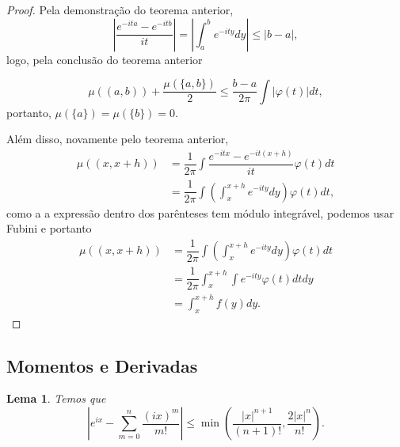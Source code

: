 \documentclass[12pt,a4paper,oneside]{book}
\newtheorem{lemma}[theorem]{Lema}
\theoremstyle{definition}
\theoremstyle{remark}
\numberwithin{equation}{section}
\begin{document}
\begin{proof}
Pela demonstração do teorema anterior,
$$\left| \dfrac{ e^{-ita}-e^{-itb}}{it}\right| = \left| \int^b_a e^{-ity}dy  \right| \leq |b-a|, $$
logo, pela conclusão do teorema anterior

$$\mu((a,b)) + \dfrac{\mu(\{a,b\})}{2} \leq \dfrac{b-a}{2\pi}\int |\varphi(t)|dt, $$
portanto, $\mu(\{a\}) = \mu(\{b\})=0.$

Além disso, novamente pelo teorema anterior,
\begin{align*}
\mu((x,x+h)) & = \dfrac{1}{2\pi}\int \dfrac{e^{-itx} - e^{-it(x+h)}}{it}\varphi(t)dt\\
& = \dfrac{1}{2\pi}\int\left( \int^{x+h}_{x} e^{-ity}dy \right)\varphi(t)dt,
\end{align*}
como a a expressão dentro dos parênteses tem módulo integrável, podemos usar Fubini e portanto
\begin{align*}
\mu((x,x+h)) &  = \dfrac{1}{2\pi}\int\left( \int^{x+h}_{x} e^{-ity}dy \right)\varphi(t)dt\\
& = \dfrac{1}{2\pi}\int^{x+h}_{x}\int e^{-ity} \varphi(t)dtdy\\
& =\int^{x+h}_{x}f(y)dy.
\end{align*}
\end{proof}




\subsection{Momentos e Derivadas}








































\begin{lemma}\label{lema- expnt-estim-erro} Temos que
$$\left| e^{ix}  - \sum^n_{m=0}\dfrac{(ix)^m}{m!}   \right| \leq
 \min \left( \dfrac{|x|^{n+1}}{(n+1)!}  , \dfrac{2|x|^n}{n!}  \right). $$\end{lemma}
 
\end{document}
